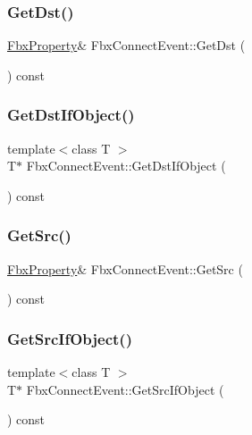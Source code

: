 \subsubsection{\texorpdfstring{Get\+Dst()}{GetDst()}}
{\footnotesize\ttfamily \hyperlink{class_fbx_property}{Fbx\+Property}\& Fbx\+Connect\+Event\+::\+Get\+Dst (\begin{DoxyParamCaption}{ }\end{DoxyParamCaption}) const}

\mbox{\label{class_fbx_connect_event_a7b52443ca2c001639f5776ee3540538a}} 
\subsubsection{\texorpdfstring{Get\+Dst\+If\+Object()}{GetDstIfObject()}}
{\footnotesize\ttfamily template$<$class T $>$ \\
T$\ast$ Fbx\+Connect\+Event\+::\+Get\+Dst\+If\+Object (\begin{DoxyParamCaption}{ }\end{DoxyParamCaption}) const}

\mbox{\label{class_fbx_connect_event_adc2a02fd551701700f1d0921d7e96a73}} 
\subsubsection{\texorpdfstring{Get\+Src()}{GetSrc()}}
{\footnotesize\ttfamily \hyperlink{class_fbx_property}{Fbx\+Property}\& Fbx\+Connect\+Event\+::\+Get\+Src (\begin{DoxyParamCaption}{ }\end{DoxyParamCaption}) const}

\mbox{\label{class_fbx_connect_event_a053adb5f16ff6d0e94e0511506070a38}} 
\subsubsection{\texorpdfstring{Get\+Src\+If\+Object()}{GetSrcIfObject()}}
{\footnotesize\ttfamily template$<$class T $>$ \\
T$\ast$ Fbx\+Connect\+Event\+::\+Get\+Src\+If\+Object (\begin{DoxyParamCaption}{ }\end{DoxyParamCaption}) const}

